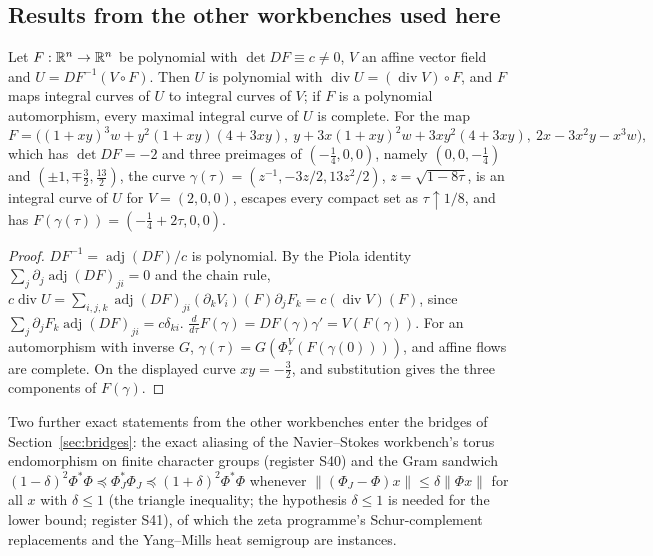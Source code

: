\subsection{Results from the other workbenches used here}

\begin{lemma}\label{lem:keller}
Let $F:\mathbb{R}^n\to\mathbb{R}^n$ be polynomial with $\det DF\equiv c\ne0$, $V$ an affine vector field and $U=DF^{-1}(V\circ F)$. Then $U$ is polynomial with $\operatorname{div}U=(\operatorname{div}V)\circ F$, and $F$ maps integral curves of $U$ to integral curves of $V$; if $F$ is a polynomial automorphism, every maximal integral curve of $U$ is complete.
For the map
\[
F=\big((1+xy)^3w+y^2(1+xy)(4+3xy),\ y+3x(1+xy)^2w+3xy^2(4+3xy),\ 2x-3x^2y-x^3w\big),
\]
which has $\det DF=-2$ and three preimages of $(-\tfrac14,0,0)$, namely $(0,0,-\tfrac14)$ and $(\pm1,\mp\tfrac32,\tfrac{13}2)$, the curve $\gamma(\tau)=(z^{-1},-3z/2,13z^2/2)$, $z=\sqrt{1-8\tau}$, is an integral curve of $U$ for $V=(2,0,0)$, escapes every compact set as $\tau\uparrow1/8$, and has $F(\gamma(\tau))=(-\tfrac14+2\tau,0,0)$.
\end{lemma}

\begin{proof}
$DF^{-1}=\operatorname{adj}(DF)/c$ is polynomial. By the Piola identity $\sum_j\partial_j\operatorname{adj}(DF)_{ji}=0$ and the chain rule, $c\operatorname{div}U=\sum_{i,j,k}\operatorname{adj}(DF)_{ji}(\partial_kV_i)(F)\partial_jF_k=c(\operatorname{div}V)(F)$, since $\sum_j\partial_jF_k\operatorname{adj}(DF)_{ji}=c\delta_{ki}$. $\frac d{d\tau}F(\gamma)=DF(\gamma)\gamma'=V(F(\gamma))$. For an automorphism with inverse $G$, $\gamma(\tau)=G(\Phi^V_\tau(F(\gamma(0))))$, and affine flows are complete. On the displayed curve $xy=-\tfrac32$, and substitution gives the three components of $F(\gamma)$.
\end{proof}

Two further exact statements from the other workbenches enter the bridges of Section~\ref{sec:bridges}: the exact aliasing of the Navier--Stokes workbench's torus endomorphism on finite character groups (register S40) and the Gram sandwich $(1-\delta)^2\Phi^*\Phi\preceq\Phi_J^*\Phi_J\preceq(1+\delta)^2\Phi^*\Phi$ whenever $\|(\Phi_J-\Phi)x\|\le\delta\|\Phi x\|$ for all $x$ with $\delta\le1$ (the triangle inequality; the hypothesis $\delta\le1$ is needed for the lower bound; register S41), of which the zeta programme's Schur-complement replacements and the Yang--Mills heat semigroup are instances.
